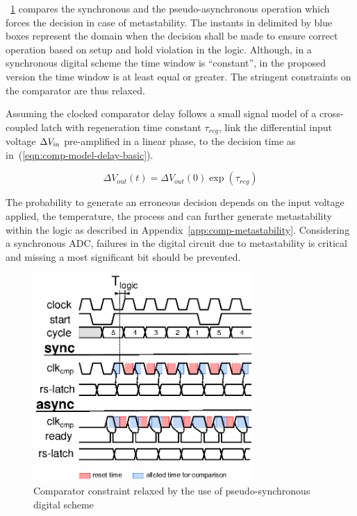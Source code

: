 \figurename~\ref{fig:sar-sync-async} compares the synchronous and the pseudo-asynchronous operation which forces the decision in case of metastability. The instants in delimited by blue boxes represent the domain when the decision shall be made to ensure correct operation based on setup and hold violation in the logic. Although, in a synchronous digital scheme the time window is ``constant'', in the proposed version the time window is at least equal or greater. The stringent constraints on the comparator are thus relaxed.

Assuming the clocked comparator delay follows a small signal model of a cross-coupled latch with regeneration time constant \(\tau_{reg} \), link the differential input voltage \(\Delta V_{\rm in}\) pre-amplified in a linear phase, to the decision time as in~(\ref{eqn:comp-model-delay-basic}).

\begin{equation}
	\label{eqn:comp-model-delay-basic}
\Delta V_{out}(t) = \Delta V_{out}(0) \exp\left(\tau_{reg}\right)
\end{equation}

The probability to generate an erroneous decision depends on the input voltage applied, the temperature, the process and can further generate metastability within the logic as described in Appendix~\ref{app:comp-metastability}. Considering a synchronous ADC, failures in the digital circuit due to metastability is critical and missing a most significant bit should be prevented.

\begin{figure}[htp]
	\centering
	\includegraphics[width=0.75\textwidth]{Chapter4/Figs/sar-comp-constraint.ps}
	\caption{Comparator constraint relaxed by the use of pseudo-synchronous digital scheme}
	\label{fig:sar-sync-async}
\end{figure}

